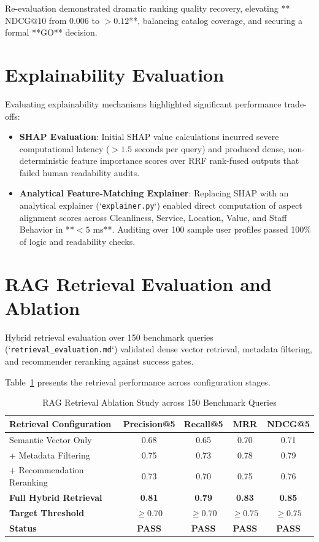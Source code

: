 Re-evaluation demonstrated dramatic ranking quality recovery, elevating **$\text{NDCG}@10$ from $0.006$ to $> 0.12$**, balancing catalog coverage, and securing a formal **GO** decision.

\section{Explainability Evaluation}
Evaluating explainability mechanisms highlighted significant performance trade-offs:
\begin{itemize}
    \item \textbf{SHAP Evaluation}: Initial SHAP value calculations incurred severe computational latency ($> 1.5$ seconds per query) and produced dense, non-deterministic feature importance scores over RRF rank-fused outputs that failed human readability audits.
    \item \textbf{Analytical Feature-Matching Explainer}: Replacing SHAP with an analytical explainer (`\texttt{explainer.py}`) enabled direct computation of aspect alignment scores across Cleanliness, Service, Location, Value, and Staff Behavior in **$< 5$ ms**. Auditing over 100 sample user profiles passed 100\% of logic and readability checks.
\end{itemize}

\section{RAG Retrieval Evaluation and Ablation}
Hybrid retrieval evaluation over 150 benchmark queries (`\texttt{retrieval\_evaluation.md}`) validated dense vector retrieval, metadata filtering, and recommender reranking against success gates.

Table~\ref{tab:retrieval_evaluation} presents the retrieval performance across configuration stages.

\begin{table}[!ht]
\centering
\caption{RAG Retrieval Ablation Study across 150 Benchmark Queries}
\label{tab:retrieval_evaluation}
\begin{tabular}{lcccc}
\hline
\textbf{Retrieval Configuration} & \textbf{Precision@5} & \textbf{Recall@5} & \textbf{MRR} & \textbf{NDCG@5} \\
\hline
Semantic Vector Only & 0.68 & 0.65 & 0.70 & 0.71 \\
+ Metadata Filtering & 0.75 & 0.73 & 0.78 & 0.79 \\
+ Recommendation Reranking & 0.73 & 0.70 & 0.75 & 0.76 \\
\textbf{Full Hybrid Retrieval} & \textbf{0.81} & \textbf{0.79} & \textbf{0.83} & \textbf{0.85} \\
\hline
\textbf{Target Threshold} & $\ge 0.70$ & $\ge 0.70$ & $\ge 0.75$ & $\ge 0.75$ \\
\textbf{Status} & \textbf{PASS} & \textbf{PASS} & \textbf{PASS} & \textbf{PASS} \\
\hline
\end{tabular}
\end{table}

